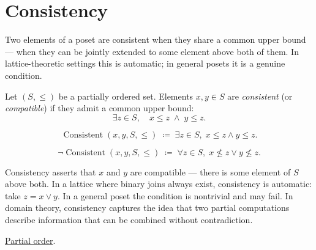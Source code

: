 
\section{Consistency}
\label{sec:consistency}

\begin{tcolorbox}[
  colback=gray!6,
  colframe=gray!40,
  arc=2pt,
  left=8pt, right=8pt, top=6pt, bottom=6pt,
  title={\small\textbf{Toolkit: Consistency}},
  fonttitle=\small\bfseries
]
Two elements of a poset are consistent when they share a common upper
bound — when they can be jointly extended to some element above both of
them.  In lattice-theoretic settings this is automatic; in general posets
it is a genuine condition.
\end{tcolorbox}


\begin{definition}[Consistency]
\label{def:consistency}
Let $(S, \leq)$ be a partially ordered set.  Elements $x, y \in S$ are
\emph{consistent} (or \emph{compatible}) if they admit a common upper
bound:
\[
\exists z \in S, \quad x \leq z \;\land\; y \leq z.
\]
\end{definition}

\begin{remark*}
\[
\operatorname{Consistent}(x, y, S, \leq)
\;\coloneqq\;
\exists z \in S,\; x \leq z \land y \leq z.
\]
\end{remark*}

\begin{remark*}
\[
\neg\operatorname{Consistent}(x, y, S, \leq)
\;\coloneqq\;
\forall z \in S,\; x \not\leq z \lor y \not\leq z.
\]
\end{remark*}

\begin{remark*}[Interpretation]
Consistency asserts that $x$ and $y$ are compatible — there is some
element of $S$ above both.  In a lattice where binary joins always exist,
consistency is automatic: take $z = x \vee y$.  In a general poset the
condition is nontrivial and may fail.  In domain theory, consistency
captures the idea that two partial computations describe information that
can be combined without contradiction.
\end{remark*}

\begin{remark*}[Dependencies]
\hyperref[def:lattice-order-partial-order]{Partial order}.
\end{remark*}
